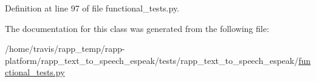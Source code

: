 Definition at line 97 of file functional\-\_\-tests.\-py.



The documentation for this class was generated from the following file\-:\begin{DoxyCompactItemize}
\item 
/home/travis/rapp\-\_\-temp/rapp-\/platform/rapp\-\_\-text\-\_\-to\-\_\-speech\-\_\-espeak/tests/rapp\-\_\-text\-\_\-to\-\_\-speech\-\_\-espeak/\hyperlink{functional__tests_8py}{functional\-\_\-tests.\-py}\end{DoxyCompactItemize}

